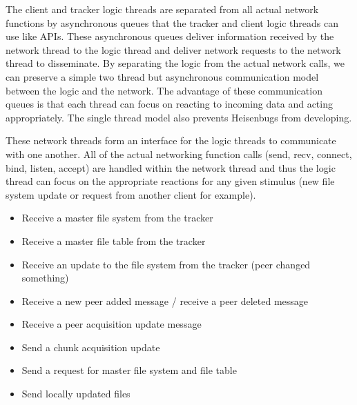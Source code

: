 	
The client and tracker logic threads are separated from all actual network functions by asynchronous queues that the tracker and client logic threads can use like APIs. These asynchronous queues deliver information received by the network thread to the logic thread and deliver network requests to the network thread to disseminate. By separating the logic from the actual network calls, we can preserve a simple two thread but asynchronous communication model between the logic and the network.
The advantage of these communication queues is that each thread can focus on reacting to incoming data and acting appropriately. The single thread model also prevents Heisenbugs from developing. 

These network threads form an interface for the logic threads to communicate with one another. All of the actual networking function calls (send, recv, connect, bind, listen, accept) are handled within the network thread and thus the logic thread can focus on the appropriate reactions for any given stimulus (new file system update or request from another client for example).



	\begin{itemize}
		\item Receive a master file system from the tracker
		\item Receive a master file table from the tracker
		\item Receive an update to the file system from the tracker (peer changed something)
		\item Receive a new peer added message / receive a peer deleted message
		\item Receive a peer acquisition update message
	\end{itemize}
 

	\begin{itemize}
		\item Send a chunk acquisition update
		\item Send a request for master file system and file table
		\item Send locally updated files
	\end{itemize}


